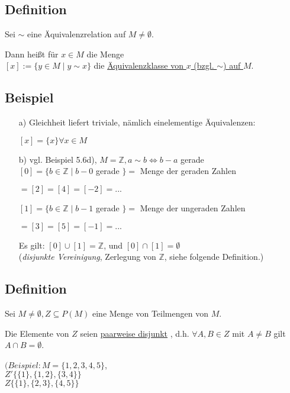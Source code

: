 \documentclass[a4paper, 12pt, twoside] {article}
\begin{document}
\subsection{Definition}
Sei $\sim$ eine Äquivalenzrelation auf $M \neq \emptyset$.

Dann heißt für $x \in M$ die Menge \\
$[x] := \{y \in M \mid y \sim x \}$ die \underline{Äquivalenzklasse von $x$ (bzgl. $\sim$) auf $M$}.

\subsection{Beispiel}

\begin{itemize}
\item[a)] Gleichheit liefert triviale, nämlich einelementige Äquivalenzen:

$[x] = \{x\} \forall x \in M$

\item[b)] vgl. Beispiel 5.6d), $M = \mathbb{Z}, a \sim b \Leftrightarrow b-a$ gerade \\
$[0] = \{b \in \mathbb{Z} \mid b-0$ gerade $\} = $ Menge der geraden Zahlen

\qquad $= [2] = [4] = [-2] = ...$

$[1] = \{b \in \mathbb{Z} \mid b-1$ gerade $\} = $ Menge der ungeraden Zahlen

\qquad $= [3] = [5] = [-1] = ...$

Es gilt: $[0] \cup [1] = \mathbb{Z}$, und $[0] \cap [1] = \emptyset$ \\
(\textit{disjunkte Vereinigung}, Zerlegung von $\mathbb{Z}$, siehe folgende Definition.)
\end{itemize}

\subsection{Definition}
Sei $M \neq \emptyset, Z \subseteq P(M)$ eine Menge von Teilmengen von $M$.

Die Elemente von $Z$ seien \underline{paarweise disjunkt} , d.h. $\forall A, B \in Z$ mit $A \neq B$ gilt $A \cap B = \emptyset$.

$(Beispiel: M = \{1, 2, 3, 4, 5\}$, \\
$Z'  \{\{1\}, \{1, 2\}, \{3, 4\}\}$ \\
$Z  \{\{1\}, \{2, 3\}, \{4, 5\}\}$ \\
\end{document}
